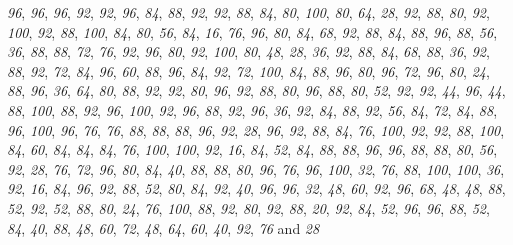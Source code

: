\documentclass[
]{book}
\begin{document}
\emph{96}, \emph{96}, \emph{96}, \emph{92}, \emph{92}, \emph{96}, \emph{84}, \emph{88}, \emph{92}, \emph{92}, \emph{88}, \emph{84}, \emph{80}, \emph{100}, \emph{80}, \emph{64}, \emph{28}, \emph{92}, \emph{88}, \emph{80}, \emph{92}, \emph{100}, \emph{92}, \emph{88}, \emph{100}, \emph{84}, \emph{80}, \emph{56}, \emph{84}, \emph{16}, \emph{76}, \emph{96}, \emph{80}, \emph{84}, \emph{68}, \emph{92}, \emph{88}, \emph{84}, \emph{88}, \emph{96}, \emph{88}, \emph{56}, \emph{36}, \emph{88}, \emph{88}, \emph{72}, \emph{76}, \emph{92}, \emph{96}, \emph{80}, \emph{92}, \emph{100}, \emph{80}, \emph{48}, \emph{28}, \emph{36}, \emph{92}, \emph{88}, \emph{84}, \emph{68}, \emph{88}, \emph{36}, \emph{92}, \emph{88}, \emph{92}, \emph{72}, \emph{84}, \emph{96}, \emph{60}, \emph{88}, \emph{96}, \emph{84}, \emph{92}, \emph{72}, \emph{100}, \emph{84}, \emph{88}, \emph{96}, \emph{80}, \emph{96}, \emph{72}, \emph{96}, \emph{80}, \emph{24}, \emph{88}, \emph{96}, \emph{36}, \emph{64}, \emph{80}, \emph{88}, \emph{92}, \emph{92}, \emph{80}, \emph{96}, \emph{92}, \emph{88}, \emph{80}, \emph{96}, \emph{88}, \emph{80}, \emph{52}, \emph{92}, \emph{92}, \emph{44}, \emph{96}, \emph{44}, \emph{88}, \emph{100}, \emph{88}, \emph{92}, \emph{96}, \emph{100}, \emph{92}, \emph{96}, \emph{88}, \emph{92}, \emph{96}, \emph{36}, \emph{92}, \emph{84}, \emph{88}, \emph{92}, \emph{56}, \emph{84}, \emph{72}, \emph{84}, \emph{88}, \emph{96}, \emph{100}, \emph{96}, \emph{76}, \emph{76}, \emph{88}, \emph{88}, \emph{88}, \emph{96}, \emph{92}, \emph{28}, \emph{96}, \emph{92}, \emph{88}, \emph{84}, \emph{76}, \emph{100}, \emph{92}, \emph{92}, \emph{88}, \emph{100}, \emph{84}, \emph{60}, \emph{84}, \emph{84}, \emph{84}, \emph{76}, \emph{100}, \emph{100}, \emph{92}, \emph{16}, \emph{84}, \emph{52}, \emph{84}, \emph{88}, \emph{88}, \emph{96}, \emph{96}, \emph{88}, \emph{88}, \emph{80}, \emph{56}, \emph{92}, \emph{28}, \emph{76}, \emph{72}, \emph{96}, \emph{80}, \emph{84}, \emph{40}, \emph{88}, \emph{88}, \emph{80}, \emph{96}, \emph{76}, \emph{96}, \emph{100}, \emph{32}, \emph{76}, \emph{88}, \emph{100}, \emph{100}, \emph{36}, \emph{92}, \emph{16}, \emph{84}, \emph{96}, \emph{92}, \emph{88}, \emph{52}, \emph{80}, \emph{84}, \emph{92}, \emph{40}, \emph{96}, \emph{96}, \emph{32}, \emph{48}, \emph{60}, \emph{92}, \emph{96}, \emph{68}, \emph{48}, \emph{48}, \emph{88}, \emph{52}, \emph{92}, \emph{52}, \emph{88}, \emph{80}, \emph{24}, \emph{76}, \emph{100}, \emph{88}, \emph{92}, \emph{80}, \emph{92}, \emph{88}, \emph{20}, \emph{92}, \emph{84}, \emph{52}, \emph{96}, \emph{96}, \emph{88}, \emph{52}, \emph{84}, \emph{40}, \emph{88}, \emph{48}, \emph{60}, \emph{72}, \emph{48}, \emph{64}, \emph{60}, \emph{40}, \emph{92}, \emph{76} and \emph{28}
\end{document}
